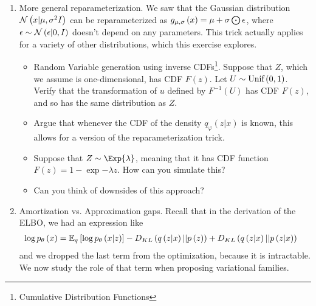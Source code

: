 \documentclass{article}
\begin{document}
\begin{enumerate}
\item More general reparameterization. We saw that the Gaussian distribution
$\mathcal{N}\left(x \vert \mu, \sigma^2 I\right)$ can be reparameterized as $g_{\mu,
  \sigma}\left(x\right) = \mu + \sigma \bigodot \epsilon$, where $\epsilon \sim
\mathcal{N}\left(\epsilon \vert 0, I\right)$ doesn't depend on any parameters. This trick
actually applies for a variety of other distributions, which this exercise
explores.
\begin{itemize}
\item Random Variable generation using inverse CDFs\footnote{Cumulative Distribution Functions}. Suppose
  that $Z$, which we assume is one-dimensional, has CDF $F\left(z\right)$. Let
  $U \sim \textnormal{Unif}\left(0, 1\right)$. Verify that the transformation of $u$ defined
  by $F^{-1}\left(U\right)$ has CDF $F\left(z\right)$, and so has the same
  distribution as $Z$.
\item Argue that whenever the CDF of the density $q_{\varphi}\left(z \vert
  x\right)$ is known, this allows for a version of the reparameterization trick.
\item Suppose that $Z \sim \Exp{\lambda}$, meaning that it has CDF function
  $F\left(z\right) = 1 - \exp{-\lambda z}$. How can you simulate this?
\item Can you think of downsides of this approach?
\end{itemize}

\item Amortization vs. Approximation gaps. Recall that in the derivation of the
  ELBO, we had an expression like
  \begin{align*}
    \log p_{\theta}\left(x\right) &= \mathbb{E}_{q}\left[{\log p_{\theta}\left(x \vert
      z\right)}\right] - D_{KL}\left(q\left(z \vert x\right) \vert \vert
    p\left(z\right)\right) + D_{KL}\left(q\left(z \vert x\right) \vert \vert
    p\left(z \vert x\right)\right)
  \end{align*}
  and we dropped the last term from the optimization, because it is intractable.
  We now study the role of that term when proposing variational families.


\end{enumerate}
\end{document}

